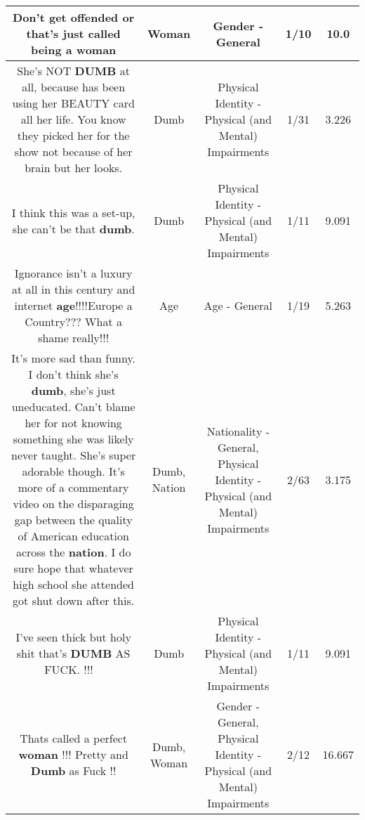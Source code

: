 \documentclass[11pt]{article}
\newlength\mylength
\begin{document}
\begin{center}
\begin{longtable}{|C{.65\mylength}|C{.30\mylength}|C{.12\mylength}|C{.12\mylength}|C{.12\mylength}|}
  \small Don't get offended or that's just called being a woman\normalsize   & Woman & Gender - General & 1/10 & 10.0 \\  \hline
  \small She's NOT \textbf{DUMB} at all, because has been using her BEAUTY card all her life.  You know they picked her for the show not because of her brain but her looks.\normalsize   & Dumb & Physical Identity - Physical (and Mental) Impairments & 1/31 & 3.226 \\  \hline
  \small I think this was a set-up, she can't be that \textbf{dumb}.\normalsize   & Dumb & Physical Identity - Physical (and Mental) Impairments & 1/11 & 9.091 \\  \hline
  \small Ignorance isn't a luxury at all in this century and internet \textbf{age}!!!!Europe a Country??? What a shame really!!!\normalsize   & Age & Age - General & 1/19 & 5.263 \\  \hline
  \small It's more sad than funny. I don't think she's \textbf{dumb}, she's just uneducated. Can't blame her for not knowing something she was likely never taught. She's super adorable though. It's more of a commentary video on the disparaging gap between the quality of American education across the \textbf{nation}. I do sure hope that whatever high school she attended got shut down after this.\normalsize   & Dumb, Nation & Nationality - General, Physical Identity - Physical (and Mental) Impairments & 2/63 & 3.175 \\  \hline
  \small I've seen thick but holy shit that's \textbf{DUMB} AS FUCK. !!!🤤🤤🤤\normalsize   & Dumb & Physical Identity - Physical (and Mental) Impairments & 1/11 & 9.091 \\  \hline
  \small Thats called a perfect \textbf{woman} !!! Pretty and \textbf{Dumb} as Fuck !!\normalsize   & Dumb, Woman & Gender - General, Physical Identity - Physical (and Mental) Impairments & 2/12 & 16.667 \\  \hline

\end{longtable}
\end{center}
\end{document}
